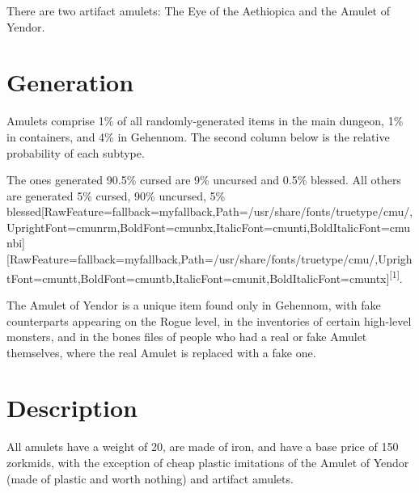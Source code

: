 There are two artifact\footnotemark[20] amulets: The Eye of the Aethiopica\footnotemark[21] and the Amulet of Yendor\footnotemark[22].





\section{Generation}
\label{1}
Amulets comprise 1\% of all randomly-{}generated items in the main dungeon, 1\% in containers, and 4\% in Gehennom\footnotemark[23]. The second column below is the relative probability of each subtype.


The ones generated 90.5\% cursed are 9\% uncursed and 0.5\% blessed. All others are generated 5\% cursed, 90\% uncursed, 5\% blessed\allowbreak{}\setmainfont{cmunrm.ttf}[RawFeature={fallback=myfallback},Path=/usr/share/fonts/truetype/cmu/,UprightFont=cmunrm,BoldFont=cmunbx,ItalicFont=cmunti,BoldItalicFont=cmunbi]\setmonofont{cmunrm.ttf}[RawFeature={fallback=myfallback},Path=/usr/share/fonts/truetype/cmu/,UprightFont=cmuntt,BoldFont=cmuntb,ItalicFont=cmunit,BoldItalicFont=cmuntx]\textsuperscript{{$\text{[}$}1{$\text{]}$}}.


The Amulet of Yendor is a unique item\footnotemark[24] found only in Gehennom\footnotemark[25], with fake counterparts appearing on the Rogue level\footnotemark[26], in the inventories of certain high-{}level monsters, and in the bones files of people who had a real or fake Amulet themselves, where the real Amulet is replaced with a fake one.



\section{Description}
\label{2}
All amulets have a weight\footnotemark[27] of 20, are made of iron\footnotemark[28], and have a base price of 150 zorkmids\footnotemark[29], with the exception of cheap plastic imitations of the Amulet of Yendor\footnotemark[30] (made of plastic\footnotemark[31] and worth nothing) and artifact\footnotemark[32] amulets.


